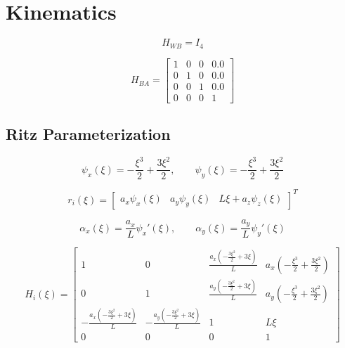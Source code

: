 \documentclass[11pt]{article}
\begin{document}
\section{Kinematics}
\begin{equation}
H_{WB}=I_4
\end{equation}

\begin{equation}
H_{BA}=\begin{bmatrix}1 & 0 & 0 & 0.0\\0 & 1 & 0 & 0.0\\0 & 0 & 1 & 0.0\\0 & 0 & 0 & 1\end{bmatrix}\label{eq:mount-transform}
\end{equation}

\subsection{Ritz Parameterization}
\begin{equation}
\psi_x(\xi)=- \frac{\xi^{3}}{2} + \frac{3 \xi^{2}}{2},\qquad\psi_y(\xi)=- \frac{\xi^{3}}{2} + \frac{3 \xi^{2}}{2}
\end{equation}

\begin{equation}
r_i(\xi)=\begin{bmatrix}a_x\psi_x(\xi)&a_y\psi_y(\xi)&L\xi+a_z\psi_z(\xi)\end{bmatrix}^T
\end{equation}

\begin{equation}
\alpha_x(\xi)=\frac{a_x}{L}\psi_x'(\xi),\qquad \alpha_y(\xi)=\frac{a_y}{L}\psi_y'(\xi)
\end{equation}

\begin{equation}
H_i(\xi)=\begin{bmatrix}1 & 0 & \frac{a_x \left(- \frac{3 \xi^{2}}{2} + 3 \xi\right)}{L} & a_x \left(- \frac{\xi^{3}}{2} + \frac{3 \xi^{2}}{2}\right)\\0 & 1 & \frac{a_y \left(- \frac{3 \xi^{2}}{2} + 3 \xi\right)}{L} & a_y \left(- \frac{\xi^{3}}{2} + \frac{3 \xi^{2}}{2}\right)\\- \frac{a_x \left(- \frac{3 \xi^{2}}{2} + 3 \xi\right)}{L} & - \frac{a_y \left(- \frac{3 \xi^{2}}{2} + 3 \xi\right)}{L} & 1 & L \xi\\0 & 0 & 0 & 1\end{bmatrix}\label{eq:local-transform}
\end{equation}
\end{document}
